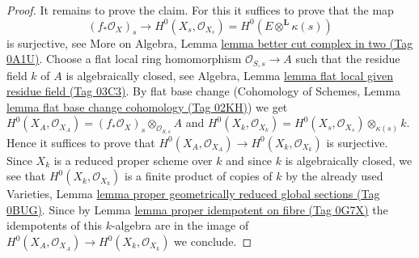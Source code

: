 \documentclass{amsart}
\theoremstyle{plain}
\theoremstyle{definition}
\theoremstyle{remark}
\numberwithin{equation}{subsection}
\begin{document}
\begin{proof}
\medskip\noindent
It remains to prove the claim. For this it suffices to prove that the map
$$
(f_*\mathcal{O}_X)_s
\longrightarrow
H^0(X_s, \mathcal{O}_{X_s}) = H^0(E \otimes^\mathbf{L} \kappa(s))
$$
is surjective, see
More on Algebra, Lemma \href{https://stacks.math.columbia.edu/tag/0A1U}{lemma better cut complex in two (Tag 0A1U)}.
Choose a flat local ring homomorphism $\mathcal{O}_{S, s} \to A$
such that the residue field $k$ of $A$ is algebraically closed, see
Algebra, Lemma \href{https://stacks.math.columbia.edu/tag/03C3}{lemma flat local given residue field (Tag 03C3)}.
By flat base change (Cohomology of Schemes, Lemma
\href{https://stacks.math.columbia.edu/tag/02KH}{lemma flat base change cohomology (Tag 02KH)})
we get $H^0(X_A, \mathcal{O}_{X_A}) =
(f_*\mathcal{O}_X)_s \otimes_{\mathcal{O}_{S, s}} A$
and $H^0(X_k, \mathcal{O}_{X_k}) =
H^0(X_s, \mathcal{O}_{X_s}) \otimes_{\kappa(s)} k$.
Hence it suffices to prove that
$H^0(X_A, \mathcal{O}_{X_A}) \to H^0(X_k, \mathcal{O}_{X_k})$
is surjective. Since $X_k$ is a reduced proper scheme over $k$
and since $k$ is algebraically closed, we see that
$H^0(X_k, \mathcal{O}_{X_k})$ is a finite product of copies
of $k$ by the already used Varieties, Lemma
\href{https://stacks.math.columbia.edu/tag/0BUG}{lemma proper geometrically reduced global sections (Tag 0BUG)}.
Since by Lemma \href{https://stacks.math.columbia.edu/tag/0G7X}{lemma proper idempotent on fibre (Tag 0G7X)}
the idempotents of this $k$-algebra are in the image
of $H^0(X_A, \mathcal{O}_{X_A}) \to H^0(X_k, \mathcal{O}_{X_k})$ we conclude.
\end{proof}
\end{document}
